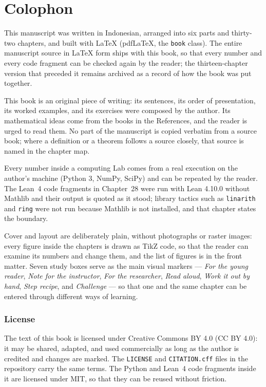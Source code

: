 \chapter*{Colophon}

This manuscript was written in Indonesian, arranged into six parts and thirty-two
chapters, and built with \LaTeX{} (pdf\LaTeX{}, the \texttt{book} class). The entire
manuscript source in \LaTeX{} form ships with this book, so that every number and every
code fragment can be checked again by the reader; the thirteen-chapter version that
preceded it remains archived as a record of how the book was put together.

This book is an original piece of writing: its sentences, its order of presentation, its
worked examples, and its exercises were composed by the author. Its mathematical ideas
come from the books in the References, and the reader is urged to read them. No part of
the manuscript is copied verbatim from a source book; where a definition or a theorem
follows a source closely, that source is named in the chapter map.

Every number inside a computing Lab comes from a real execution on the author's machine
(Python 3, NumPy, SciPy) and can be repeated by the reader. The Lean~4 code fragments in
Chapter~28 were run with Lean 4.10.0 without Mathlib and their output is quoted as it
stood; library tactics such as \texttt{linarith} and \texttt{ring} were not run because
Mathlib is not installed, and that chapter states the boundary.

Cover and layout are deliberately plain, without photographs or raster images: every
figure inside the chapters is drawn as TikZ code, so that the reader can examine its
numbers and change them, and the list of figures is in the front matter. Seven study boxes
serve as the main visual markers --- \emph{For the young reader}, \emph{Note for the
instructor}, \emph{For the researcher}, \emph{Read aloud}, \emph{Work it out by hand},
\emph{Step recipe}, and \emph{Challenge} --- so that one and the same chapter can be
entered through different ways of learning.

\subsection*{License}
The text of this book is licensed under Creative Commons BY 4.0 (CC BY 4.0): it may be
shared, adapted, and used commercially as long as the author is credited and changes are
marked. The \texttt{LICENSE} and \texttt{CITATION.cff} files in the repository carry the
same terms. The Python and Lean~4 code fragments inside it are licensed under MIT, so that
they can be reused without friction.

